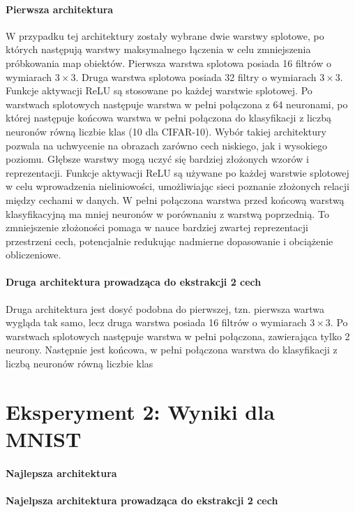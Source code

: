 \documentclass[10pt]{article}
\begin{document}
\paragraph{Pierwsza architektura}
W przypadku tej architektury zostały wybrane dwie warstwy splotowe, po których następują warstwy maksymalnego łączenia w celu zmniejszenia próbkowania map obiektów.
Pierwsza warstwa splotowa posiada 16 filtrów o wymiarach $3 \times 3$.
Druga warstwa splotowa posiada 32 filtry o wymiarach $3 \times 3$.
Funkcje aktywacji ReLU są stosowane po każdej warstwie splotowej.
Po warstwach splotowych następuje warstwa w pełni połączona z 64 neuronami, po której następuje końcowa warstwa w pełni połączona do klasyfikacji z liczbą neuronów równą liczbie klas (10 dla CIFAR-10).
Wybór takiej architektury pozwala na uchwycenie na obrazach zarówno cech niskiego, jak i wysokiego poziomu. Głębsze warstwy mogą uczyć się bardziej złożonych wzorów i reprezentacji.
Funkcje aktywacji ReLU są używane po każdej warstwie splotowej w celu wprowadzenia nieliniowości, umożliwiając sieci poznanie złożonych relacji między cechami w danych.
W pełni połączona warstwa przed końcową warstwą klasyfikacyjną ma mniej neuronów w porównaniu z warstwą poprzednią. To zmniejszenie złożoności pomaga w nauce bardziej zwartej reprezentacji przestrzeni cech, potencjalnie redukując nadmierne dopasowanie i obciążenie obliczeniowe.

\paragraph{Druga architektura prowadząca do ekstrakcji 2 cech}
Druga architektura jest dosyć podobna do pierwszej, tzn. pierwsza wartwa wygląda tak samo, lecz druga warstwa posiada 16 filtrów o wymiarach $3\times3$.
Po warstwach splotowych następuje warstwa w pełni połączona, zawierająca tylko 2 neurony. Następnie jest końcowa, w pełni połączona warstwa do klasyfikacji z liczbą neuronów równą liczbie klas

\pagebreak
\section{Eksperyment 2: Wyniki dla MNIST}\label{sec:ex2_mnist}

\paragraph{Najlepsza architektura}
\paragraph{Najelpsza architektura prowadząca do ekstrakcji 2 cech}
\end{document}
